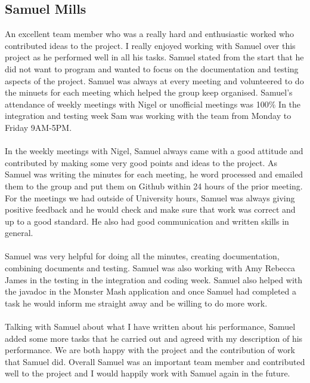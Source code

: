 \documentclass[titlepage]{article}
\begin{document}
{\subsection {Samuel Mills}
An excellent team member who was a really hard and enthusiastic worked who contributed ideas to the project.
I really enjoyed working with Samuel over this project as he performed well in all his tasks. Samuel stated from 
the start that he did not want to program and wanted to focus on the documentation and testing aspects of the project.
Samuel was always at every meeting and volunteered to do the minuets for each meeting which helped the group keep organised. Samuel’s attendance of weekly meetings with Nigel or unofficial meetings was 100\%
In the integration and testing week Sam was working with the team from Monday to Friday 9AM-5PM.
\\
\\
In the weekly meetings with Nigel, Samuel always came with a good attitude and contributed by making some very good points and ideas  to the project. As Samuel was writing the minutes for each meeting, he word processed and emailed them to the group and put them on Github within 24 hours of the prior meeting. For the meetings we had outside of University hours, Samuel was always giving positive feedback and he would check and make sure that  work was correct and up to a good standard. He also had good communication and written skills in general.
\\
\\
Samuel was very helpful for doing all the minutes, creating documentation, combining documents and testing. Samuel was also working with Amy Rebecca James in the testing in the integration and coding week. Samuel also helped with the javadoc in the Monster Mash application and once Samuel had completed a task he would inform me straight away and be willing to do more work.
\\
\\
Talking with Samuel about what I have written about his performance, Samuel added some more tasks that he carried out and agreed with my description of his performance. We are both happy with the project and the contribution of work that Samuel did. Overall Samuel was an important team member and contributed well to the project and I would happily work with Samuel again in the future.
}
\end{document}

